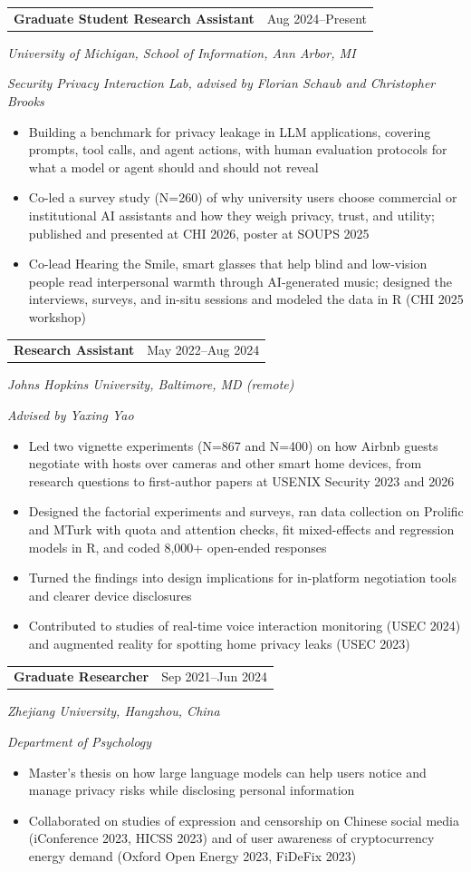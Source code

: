 \documentclass[10pt,letterpaper]{article}
\makeatletter
\newcommand{\workentry}[5]{%
  \Needspace{3.5\baselineskip}%
  \begin{tabular*}{\textwidth}{@{\extracolsep{\fill}}lr}
    \textbf{#1} & #2
  \end{tabular*}\par
  \textit{#3}\par
  \textit{#4}\par\vspace{0.18em}
  #5\par\vspace{0.60em}
}
\makeatother
\begin{document}
\workentry
  {Graduate Student Research Assistant}
  {Aug 2024--Present}
  {University of Michigan, School of Information, Ann Arbor, MI}
  {Security Privacy Interaction Lab, advised by Florian Schaub and Christopher Brooks}
  {\begin{itemize}
    \item Building a benchmark for privacy leakage in LLM applications,
      covering prompts, tool calls, and agent actions, with human evaluation
      protocols for what a model or agent should and should not reveal
    \item Co-led a survey study (N=260) of why university users choose
      commercial or institutional AI assistants and how they weigh privacy,
      trust, and utility; published and presented at CHI 2026, poster at
      SOUPS 2025
    \item Co-lead Hearing the Smile, smart glasses that help blind and
      low-vision people read interpersonal warmth through AI-generated music;
      designed the interviews, surveys, and in-situ sessions and modeled the
      data in R (CHI 2025 workshop)
  \end{itemize}}

\workentry
  {Research Assistant}
  {May 2022--Aug 2024}
  {Johns Hopkins University, Baltimore, MD (remote)}
  {Advised by Yaxing Yao}
  {\begin{itemize}
    \item Led two vignette experiments (N=867 and N=400) on how Airbnb guests
      negotiate with hosts over cameras and other smart home devices, from
      research questions to first-author papers at USENIX Security 2023 and
      2026
    \item Designed the factorial experiments and surveys, ran data collection
      on Prolific and MTurk with quota and attention checks, fit mixed-effects
      and regression models in R, and coded 8,000+ open-ended responses
    \item Turned the findings into design implications for in-platform
      negotiation tools and clearer device disclosures
    \item Contributed to studies of real-time voice interaction monitoring
      (USEC 2024) and augmented reality for spotting home privacy leaks
      (USEC 2023)
  \end{itemize}}

\workentry
  {Graduate Researcher}
  {Sep 2021--Jun 2024}
  {Zhejiang University, Hangzhou, China}
  {Department of Psychology}
  {\begin{itemize}
    \item Master's thesis on how large language models can help users notice
      and manage privacy risks while disclosing personal information
    \item Collaborated on studies of expression and censorship on Chinese
      social media (iConference 2023, HICSS 2023) and of user awareness of
      cryptocurrency energy demand (Oxford Open Energy 2023, FiDeFix 2023)
  \end{itemize}}
\end{document}
